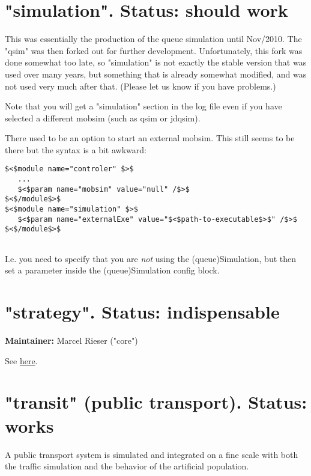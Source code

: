 \documentclass[a4paper,11pt]{report}
\begin{document}

\vfill\eject
\section{"simulation". Status: should work}

This  was essentially the production of the queue simulation until Nov/2010.  The "qsim" was then forked out for further development. Unfortunately,  this fork was done somewhat too late, so "simulation" is not exactly the  stable version that was used over many years, but something that is  already somewhat modified, and was not used very much after that.  (Please let us know if you have problems.)

Note that you will get a "simulation" section in the log file even if  you have selected a different mobsim (such as qsim or jdqsim).

There used to be an option to start an external mobsim. This still seems to be there but the syntax is a bit awkward:
\begin{verbatim}
$<$module name="controler" $>$
   ...
   $<$param name="mobsim" value="null" /$>$
$<$/module$>$
$<$module name="simulation" $>$
   $<$param name="externalExe" value="$<$path-to-executable$>$" /$>$
$<$/module$>$


\end{verbatim}

I.e. you need to specify that you are \emph{not} using the (queue)Simulation, but then set a parameter inside the (queue)Simulation config block.

\vfill\eject
\section{"strategy". Status: indispensable}

\textbf{Maintainer:} Marcel Rieser ("core")

See \href{http://matsim.org/node/478}{here}.

\vfill\eject
\section{"transit" (public transport).  Status: works}

A  public transport system is simulated and integrated on a fine scale  with both the traffic simulation and the behavior of the artificial  population.
\end{document}
